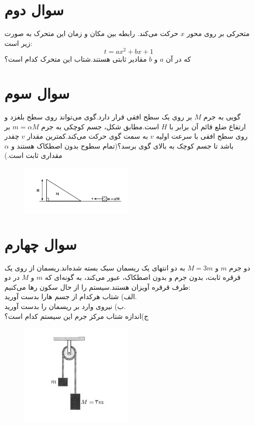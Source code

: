 \documentclass[a4paper,16pt]{article}
\begin{document}
	\section{سوال دوم}

	متحرکی بر روی محور $x$ حرکت می‌کند.  
	رابطه بین مکان و زمان این متحرک به صورت زیر است:
	\[
	t = a x^2 + b x + 1
	\]
	که در آن $a$ و $b$ مقادیر ثابتی هستند.شتاب این متحرک کدام است؟
	\section{سوال سوم}
	
	گویی به جرم $M$ بر روی یک سطح افقی قرار دارد.گوی می‌تواند روی سطح بلغزد و ارتفاع ضلع قائم آن برابر با $H$ است.مطابق شکل، جسم کوچکی به جرم $m=\alpha M$ بر روی سطح افقی با سرعت اولیه $v$ به سمت گوی حرکت می‌کند.کمترین مقدار $v$ چقدر باشد تا جسم کوچک به بالای گوی برسد؟(تمام سطوح بدون اصطکاک هستند و $\alpha$ مقداری ثابت است.)  
	\begin{figure}[h]
	    \centering
	    \includegraphics[width=0.5\textwidth]{../../images/image-E_1/image-3.png}
	    \caption{}
	    \label{fig:square_particles}
	\end{figure}
	
	\section{سوال چهارم}
	
	دو جرم $m$ و $M=3m$ به دو انتهای یک ریسمان سبک بسته شده‌اند.ریسمان از روی یک قرقره ثابت، بدون جرم و بدون اصطکاک، عبور می‌کند، به گونه‌ای که $m$ و $M$ در دو طرف قرقره آویزان هستند.سیستم را از حال سکون رها می‌کنیم:
	\\
	الف) شتاب هرکدام از جسم هارا بدست آورید.
	\\
	ب) نیروی وارد بر ریسمان  را بدست آورید.  
	\\
	ج)اندازه شتاب مرکز جرم این سیستم کدام است؟
		\begin{figure}[h]
		\centering
		\includegraphics[width=0.5\textwidth]{../../images/image-E_1/image-2.png}
		\caption{}
		\label{fig:square_particles}
	\end{figure}
	\newpage
\end{document}
